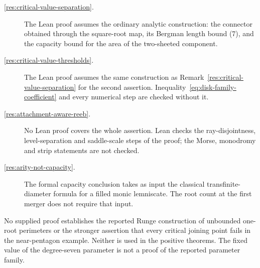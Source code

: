 \begin{description}
\item[\ref{res:critical-value-separation}.] The Lean proof assumes the ordinary analytic construction: the connector obtained through the square-root map, its
Bergman length bound (7), and the capacity bound for the area of the
two-sheeted component.

\item[\ref{res:critical-value-thresholds}.] The Lean proof assumes the same construction as
Remark~\ref{res:critical-value-separation} for the second assertion.
Inequality~\eqref{eq:disk-family-coefficient} and every numerical step are
checked without it.

\item[\ref{res:attachment-aware-reeb}.] No Lean proof covers the whole assertion. Lean checks the
ray-disjointness, level-separation and saddle-scale steps of the proof; the
Morse, monodromy and strip statements are not checked.

\item[\ref{res:arity-not-capacity}.] The formal capacity conclusion takes
as input the classical transfinite-diameter formula for a filled monic
lemniscate. The root count at the first merger does not require that input.
\end{description}

No supplied proof establishes the reported Runge construction of
unbounded one-root perimeters or the stronger assertion that every
critical joining point fails in the near-pentagon example. Neither is
used in the positive theorems. The fixed value of the degree-seven
parameter is not a proof of the reported parameter family.
\evidenceparagraph{\evidencerecordurl}


